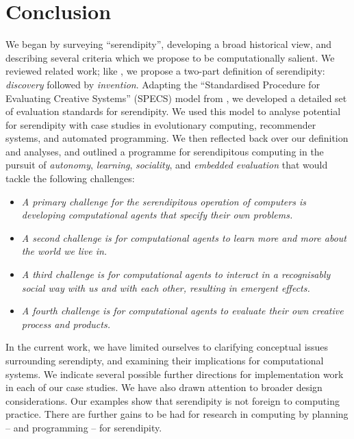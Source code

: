 \section{Conclusion} \label{sec:conclusion}

%
We began by surveying ``serendipity'', developing a broad historical
view, and describing several criteria  which we propose
to be computationally salient.  We reviewed related work; like
, we propose a two-part definition of
serendipity: \emph{discovery} followed by \emph{invention}.
%
Adapting the ``Standardised Procedure for Evaluating Creative
Systems'' (SPECS) model from , we developed a detailed set
of evaluation standards for serendipity.
%
We used this model to analyse potential for serendipity with case studies in evolutionary computing, recommender systems, and automated programming.
%
We then reflected back over our definition and analyses, and outlined a programme for
serendipitous computing in the pursuit of \emph{autonomy},
\emph{learning}, \emph{sociality}, and \emph{embedded evaluation} that
would tackle the following challenges:
%
\begin{itemize}
\item \emph{A primary challenge for the serendipitous operation of
  computers is developing computational agents that specify their own
  problems.}
\item \emph{A second challenge is for computational agents to learn
  more and more about the world we live in.}
\item \emph{A third challenge is for computational agents to interact
  in a recognisably social way with us and with each other, resulting
  in emergent effects.}
\item \emph{A fourth challenge is for computational agents to evaluate
  their own creative process and products.}
\end{itemize}
%
In the current work, we have limited ourselves to clarifying
conceptual issues surrounding serendipty, and examining their
implications for computational systems.
% 
We indicate several possible further directions for implementation
work in each of our case studies.  We have also drawn attention to
broader design considerations.  Our examples show that serendipity is
not foreign to computing practice.  There are further gains to be had
for research in computing by planning -- and programming -- for
serendipity.
%

